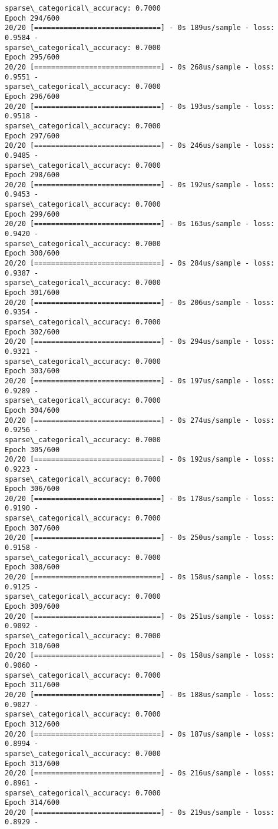 \documentclass[11pt]{article}
\begin{document}
\begin{Verbatim}[commandchars=\\\{\}]
sparse\_categorical\_accuracy: 0.7000
Epoch 294/600
20/20 [==============================] - 0s 189us/sample - loss: 0.9584 -
sparse\_categorical\_accuracy: 0.7000
Epoch 295/600
20/20 [==============================] - 0s 268us/sample - loss: 0.9551 -
sparse\_categorical\_accuracy: 0.7000
Epoch 296/600
20/20 [==============================] - 0s 193us/sample - loss: 0.9518 -
sparse\_categorical\_accuracy: 0.7000
Epoch 297/600
20/20 [==============================] - 0s 246us/sample - loss: 0.9485 -
sparse\_categorical\_accuracy: 0.7000
Epoch 298/600
20/20 [==============================] - 0s 192us/sample - loss: 0.9453 -
sparse\_categorical\_accuracy: 0.7000
Epoch 299/600
20/20 [==============================] - 0s 163us/sample - loss: 0.9420 -
sparse\_categorical\_accuracy: 0.7000
Epoch 300/600
20/20 [==============================] - 0s 284us/sample - loss: 0.9387 -
sparse\_categorical\_accuracy: 0.7000
Epoch 301/600
20/20 [==============================] - 0s 206us/sample - loss: 0.9354 -
sparse\_categorical\_accuracy: 0.7000
Epoch 302/600
20/20 [==============================] - 0s 294us/sample - loss: 0.9321 -
sparse\_categorical\_accuracy: 0.7000
Epoch 303/600
20/20 [==============================] - 0s 197us/sample - loss: 0.9289 -
sparse\_categorical\_accuracy: 0.7000
Epoch 304/600
20/20 [==============================] - 0s 274us/sample - loss: 0.9256 -
sparse\_categorical\_accuracy: 0.7000
Epoch 305/600
20/20 [==============================] - 0s 192us/sample - loss: 0.9223 -
sparse\_categorical\_accuracy: 0.7000
Epoch 306/600
20/20 [==============================] - 0s 178us/sample - loss: 0.9190 -
sparse\_categorical\_accuracy: 0.7000
Epoch 307/600
20/20 [==============================] - 0s 250us/sample - loss: 0.9158 -
sparse\_categorical\_accuracy: 0.7000
Epoch 308/600
20/20 [==============================] - 0s 158us/sample - loss: 0.9125 -
sparse\_categorical\_accuracy: 0.7000
Epoch 309/600
20/20 [==============================] - 0s 251us/sample - loss: 0.9092 -
sparse\_categorical\_accuracy: 0.7000
Epoch 310/600
20/20 [==============================] - 0s 158us/sample - loss: 0.9060 -
sparse\_categorical\_accuracy: 0.7000
Epoch 311/600
20/20 [==============================] - 0s 188us/sample - loss: 0.9027 -
sparse\_categorical\_accuracy: 0.7000
Epoch 312/600
20/20 [==============================] - 0s 187us/sample - loss: 0.8994 -
sparse\_categorical\_accuracy: 0.7000
Epoch 313/600
20/20 [==============================] - 0s 216us/sample - loss: 0.8961 -
sparse\_categorical\_accuracy: 0.7000
Epoch 314/600
20/20 [==============================] - 0s 219us/sample - loss: 0.8929 -

\end{Verbatim}
\end{document}
